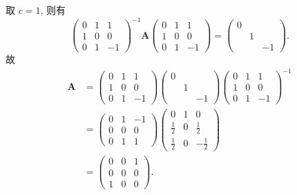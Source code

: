 \documentclass[../../main.tex]{subfiles}%
\begin{document}
\begin{solution}
取 $c = 1$, 则有
$$
\begin{pmatrix} 0 & 1 & 1 \\ 1 & 0 & 0 \\ 0 & 1 & -1 \end{pmatrix}^{-1} \boldsymbol{A} \begin{pmatrix} 0 & 1 & 1 \\ 1 & 0 & 0 \\ 0 & 1 & -1 \end{pmatrix} = \begin{pmatrix} 0 & & \\ & 1 & \\ & & -1 \end{pmatrix}.
$$
故
$$
\begin{aligned}
\boldsymbol{A} &= \begin{pmatrix} 0 & 1 & 1 \\ 1 & 0 & 0 \\ 0 & 1 & -1 \end{pmatrix} \begin{pmatrix} 0 & & \\ & 1 & \\ & & -1 \end{pmatrix} \begin{pmatrix} 0 & 1 & 1 \\ 1 & 0 & 0 \\ 0 & 1 & -1 \end{pmatrix}^{-1} \\
&= \begin{pmatrix} 0 & 1 & -1 \\ 0 & 0 & 0 \\ 0 & 1 & 1 \end{pmatrix} \begin{pmatrix} 0 & 1 & 0 \\ \frac{1}{2} & 0 & \frac{1}{2} \\ \frac{1}{2} & 0 & -\frac{1}{2} \end{pmatrix} \\
&= \begin{pmatrix} 0 & 0 & 1 \\ 0 & 0 & 0 \\ 1 & 0 & 0 \end{pmatrix}.
\end{aligned}
$$

\end{solution}
\end{document}

